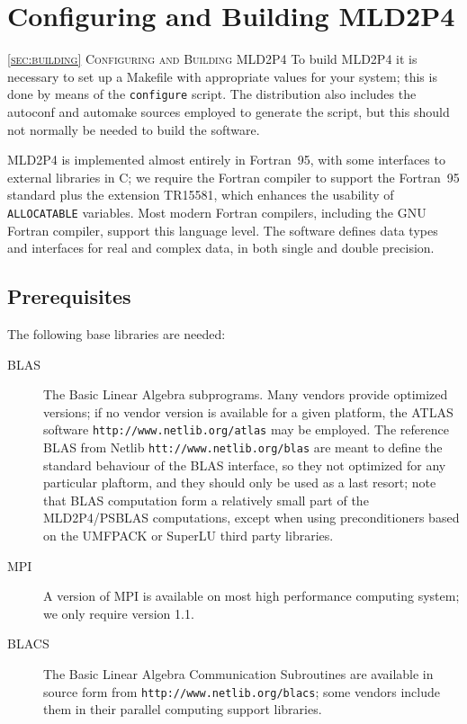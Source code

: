 \section{Configuring and Building MLD2P4\label{sec:building}}
         {\textsc{\ref{sec:building} Configuring and Building MLD2P4}}
To build MLD2P4 it is necessary to set up a Makefile with appropriate
values for your system; this is done by means of the \verb|configure|
script. The distribution also includes the autoconf and automake
sources employed to generate the script, but this should not normally
be needed to build the software. 

MLD2P4 is implemented almost entirely in Fortran~95, with some
interfaces to external libraries in C; we require the Fortran compiler
to support the Fortran~95 standard plus the extension TR15581, which
enhances the usability of \verb|ALLOCATABLE| variables. Most modern
Fortran compilers, including the GNU Fortran compiler, support this
language level. The software defines data types and interfaces for
real and complex data, in both single and double precision. 

\subsection{Prerequisites}
The following base libraries are needed: 
\begin{description}
\item[BLAS] The Basic Linear Algebra subprograms. Many vendors provide
  optimized versions; if no vendor version is available for a given 
  platform, the  ATLAS software  \verb!http://www.netlib.org/atlas!
  may be employed.  The reference BLAS from Netlib
  \verb|htt://www.netlib.org/blas| are meant to define the standard
  behaviour of the BLAS interface, so they not optimized for any
  particular plaftorm, and they should only be used as a last
  resort; note that BLAS computation form a relatively small part of
  the MLD2P4/PSBLAS computations, except when using preconditioners
  based on the UMFPACK or SuperLU third party libraries. 
\item[MPI] A version of MPI is available on most high performance
  computing system; we only require version 1.1.
\item[BLACS] The Basic Linear Algebra Communication Subroutines are
  available in source form from \verb|http://www.netlib.org/blacs|;
  some vendors  include them in their parallel computing
  support libraries. 
\end{description}

